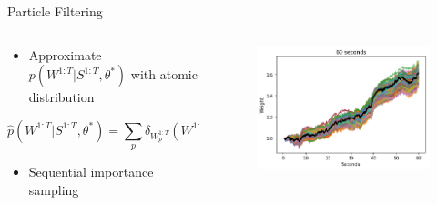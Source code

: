 \documentclass[aspectratio=169]{beamer}
\begin{document}
	
	\begin{frame}{Particle Filtering}
	
	\begin{columns}
	    \begin{column}{0.5 \textwidth}
        	    \begin{itemize}
        	        \item Approximate $p(W^{1:T}|S^{1:T}, \theta^*)$ with atomic distribution
        	    \end{itemize}
        	    
            \begin{equation}
                \hat{p}(W^{1:T}|S^{1:T}, \theta^*) = \sum_p \delta_{W^{1:T}_p} (W^{1:T}) \widetilde{v}^T_p
            \end{equation}
            
            \begin{itemize}
	           \item Sequential importance sampling
	        \end{itemize}
    
    \end{column}

	\begin{column}{0.5 \textwidth}
	\begin{figure}
	    \centering
	    \includegraphics[scale = 0.5]{true_60.png}
	\end{figure}
	
	
	\end{column}
	
	\end{columns}
	    
	\end{frame}	
	
\end{document}
